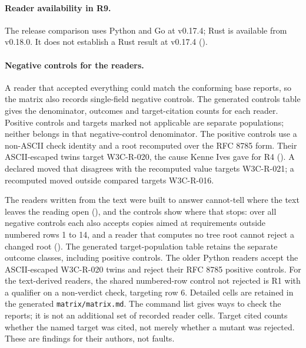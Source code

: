 \paragraph{Reader availability in R9.} The release comparison uses Python and Go at v0.17.4; Rust is available from v0.18.0. It does not establish a Rust result at v0.17.4 ().



\paragraph{Negative controls for the readers.} A reader that accepted everything could match the conforming base reports, so the matrix also records single-field negative controls. The generated controls table gives the denominator, outcomes and target-citation counts for each reader. Positive controls and targets marked not applicable are separate populations; neither belongs in that negative-control denominator. The positive controls use a non-ASCII check identity and a root recomputed over the RFC 8785 form. Their ASCII-escaped twins target W3C-R-020, the cause Kenne Ives gave for R4 (). A declared moved that disagrees with the recomputed value targets W3C-R-021; a recomputed moved outside compared targets W3C-R-016.

The readers written from the text were built to answer cannot-tell where the text leaves the reading open (), and the controls show where that stops: over all negative controls each also accepts copies aimed at requirements outside numbered rows 1 to 14, and a reader that computes no tree root cannot reject a changed root (). The generated target-population table retains the separate outcome classes, including positive controls. The older Python readers accept the ASCII-escaped W3C-R-020 twins and reject their RFC 8785 positive controls. For the text-derived readers, the shared numbered-row control not rejected is R1 with a qualifier on a non-verdict check, targeting row 6. Detailed cells are retained in the generated \texttt{matrix/matrix.md}. The command list gives ways to check the reports; it is not an additional set of recorded reader cells. Target cited counts whether the named target was cited, not merely whether a mutant was rejected. These are findings for their authors, not faults.
